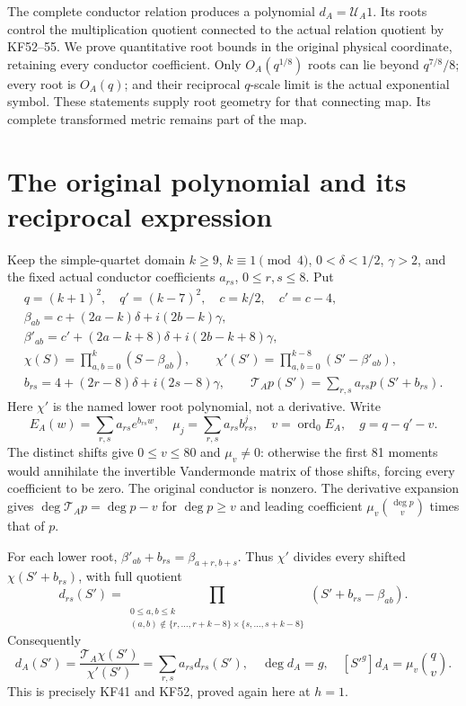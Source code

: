 \documentclass[11pt]{article}
\providecommand{\TA}{\mathcal T_A}\providecommand{\UA}{\mathcal U_A}
\begin{document}
The complete conductor relation produces a polynomial $d_A=\UA1$.
Its roots control the multiplication quotient connected to the actual
relation quotient by KF52--55. We prove quantitative root bounds in the
original physical coordinate, retaining every conductor coefficient.
Only $O_A(q^{1/8})$ roots can lie beyond $q^{7/8}/8$; every root is
$O_A(q)$; and their reciprocal $q$-scale limit is the actual exponential
symbol. These statements supply root geometry for that connecting map.
Its complete transformed metric remains part of the map.

\section{The original polynomial and its reciprocal expression}
Keep the simple-quartet domain $k\ge9$, $k\equiv1\pmod4$,
$0<\delta<1/2$, $\gamma>2$, and the fixed actual conductor coefficients
$a_{rs}$, $0\le r,s\le8$. Put
\[
\begin{gathered}
q=(k+1)^2,\quad q'=(k-7)^2,\quad c=k/2,\quad c'=c-4,\\
\beta_{ab}=c+(2a-k)\delta+i(2b-k)\gamma,\\
\beta'_{ab}=c'+(2a-k+8)\delta+i(2b-k+8)\gamma,\\
\chi(S)=\prod_{a,b=0}^k(S-\beta_{ab}),\qquad
\chi'(S')=\prod_{a,b=0}^{k-8}(S'-\beta'_{ab}),\\
b_{rs}=4+(2r-8)\delta+i(2s-8)\gamma,\qquad
\TA p(S')=\sum_{r,s}a_{rs}p(S'+b_{rs}).
\end{gathered}\tag{OR1}
\]
Here $\chi'$ is the named lower root polynomial, not a derivative.
Write
\[
E_A(w)=\sum_{r,s}a_{rs}e^{b_{rs}w},\quad
\mu_j=\sum_{r,s}a_{rs}b_{rs}^j,\quad
v=\operatorname{ord}_0E_A,\quad g=q-q'-v.
\tag{OR2}
\]
The distinct shifts give $0\le v\le80$ and $\mu_v\ne0$: otherwise
the first 81 moments would annihilate the invertible Vandermonde
matrix of those shifts, forcing every coefficient to be zero.
The original conductor is nonzero. The derivative expansion gives
$\deg\TA p=\deg p-v$ for $\deg p\ge v$ and leading coefficient
$\mu_v\binom{\deg p}{v}$ times that of $p$.

For each lower root, $\beta'_{ab}+b_{rs}=\beta_{a+r,b+s}$.
Thus $\chi'$ divides every shifted $\chi(S'+b_{rs})$, with full
quotient
\[
d_{rs}(S')=\prod_{\substack{0\le a,b\le k\\
(a,b)\notin\{r,\ldots,r+k-8\}\times\{s,\ldots,s+k-8\}}}
(S'+b_{rs}-\beta_{ab}).
\]
Consequently
\[
d_A(S')=\frac{\TA\chi(S')}{\chi'(S')}=\sum_{r,s}a_{rs}d_{rs}(S'),
\quad \deg d_A=g,\quad
[S'^g]d_A=\mu_v\binom qv.
\tag{OR3}
\]
This is precisely KF41 and KF52, proved again here at $h=1$.
\end{document}

